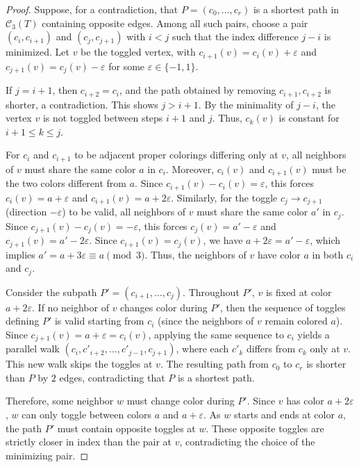 \documentclass[12pt,reqno]{amsart}
\theoremstyle{definition}
\newcommand{\C}{\mathcal{C}}
\begin{document}
\begin{proof}
Suppose, for a contradiction, that $P=(c_0,\ldots,c_r)$ is a shortest path in $\C_3(T)$ containing opposite edges. Among all such pairs, choose a pair $(c_i,c_{i+1})$ and $(c_j,c_{j+1})$ with $i<j$ such that the index difference $j-i$ is minimized. Let $v$ be the toggled vertex, with $c_{i+1}(v)=c_i(v)+\varepsilon$ and $c_{j+1}(v)=c_j(v)-\varepsilon$ for some $\varepsilon\in\{-1,1\}$.

If $j=i+1$, then $c_{i+2}=c_i$, and the path obtained by removing $c_{i+1}, c_{i+2}$ is shorter, a contradiction. This shows $j>i+1$. By the minimality of $j-i$, the vertex $v$ is not toggled between steps $i+1$ and $j$. Thus, $c_k(v)$ is constant for $i+1\le k\le j$.

For $c_i$ and $c_{i+1}$ to be adjacent proper colorings differing only at $v$, all neighbors of $v$ must share the same color $a$ in $c_i$. Moreover, $c_i(v)$ and $c_{i+1}(v)$ must be the two colors different from $a$. Since $c_{i+1}(v)-c_i(v)=\varepsilon$, this forces $c_i(v)=a+\varepsilon$ and $c_{i+1}(v)=a+2\varepsilon$. Similarly, for the toggle $c_j \to c_{j+1}$ (direction $-\varepsilon$) to be valid, all neighbors of $v$ must share the same color $a'$ in $c_j$. Since $c_{j+1}(v)-c_j(v)=-\varepsilon$, this forces $c_j(v)=a'-\varepsilon$ and $c_{j+1}(v)=a'-2\varepsilon$. Since $c_{i+1}(v)=c_j(v)$, we have $a+2\varepsilon=a'-\varepsilon$, which implies $a'=a+3\varepsilon\equiv a \pmod{3}$. Thus, the neighbors of $v$ have color $a$ in both $c_i$ and $c_j$.

Consider the subpath $P'=(c_{i+1}, \ldots, c_j)$. Throughout $P'$, $v$ is fixed at color $a+2\varepsilon$. If no neighbor of $v$ changes color during $P'$, then the sequence of toggles defining $P'$ is valid starting from $c_i$ (since the neighbors of $v$ remain colored $a$). Since $c_{j+1}(v) = a+\varepsilon = c_i(v)$, applying the same sequence to $c_i$ yields a parallel walk $(c_i, c'_{i+2}, \dots, c'_{j-1}, c_{j+1})$, where each $c'_k$ differs from $c_k$ only at $v$. This new walk skips the toggles at $v$. The resulting path from $c_0$ to $c_r$ is shorter than $P$ by $2$ edges, contradicting that $P$ is a shortest path.

Therefore, some neighbor $w$ must change color during $P'$. Since $v$ has color $a+2\varepsilon$, $w$ can only toggle between colors $a$ and $a+\varepsilon$. As $w$ starts and ends at color $a$, the path $P'$ must contain opposite toggles at $w$. These opposite toggles are strictly closer in index than the pair at $v$, contradicting the choice of the minimizing pair.
\end{proof}
\end{document}
